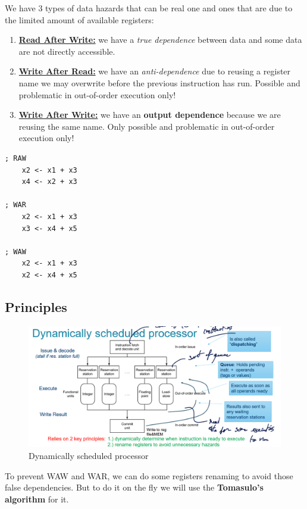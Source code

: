 \documentclass{report}
\begin{document}
We have 3 types of data hazards that can be real one and ones that are due to the limited amount of available registers:

\begin{enumerate}
    \item \underline{\textbf{Read After Write:}} we have a \textit{true dependence} between data and some data are not directly accessible.
    \item \underline{\textbf{Write After Read:}}  we have an \textit{anti-dependence} due to reusing a register name we may overwrite before the previous instruction has run. Possible and problematic in out-of-order execution only!
    \item \underline{\textbf{Write After Write:}} we have an \textbf{output dependence} because we are reusing the same name. Only possible and problematic in out-of-order execution only! 
\end{enumerate}

\begin{lstlisting}[language={[RISC-V]Assembler}]
; RAW
    x2 <- x1 + x3
    x4 <- x2 + x3

; WAR
    x2 <- x1 + x3
    x3 <- x4 + x5

; WAW
    x2 <- x1 + x3
    x2 <- x4 + x5
\end{lstlisting}

\subsection{Principles}

\begin{figure}[H]
    \centering
    \includegraphics[width=0.85\linewidth]{dynamic_principle.png}
    \caption{Dynamically scheduled processor}
    \label{fig:dynamic_principle-label}
\end{figure}

To prevent WAW and WAR, we can do some registers renaming to avoid those false dependencies. But to do it on the fly we will use the \textbf{Tomasulo's algorithm} for it.
\end{document}
